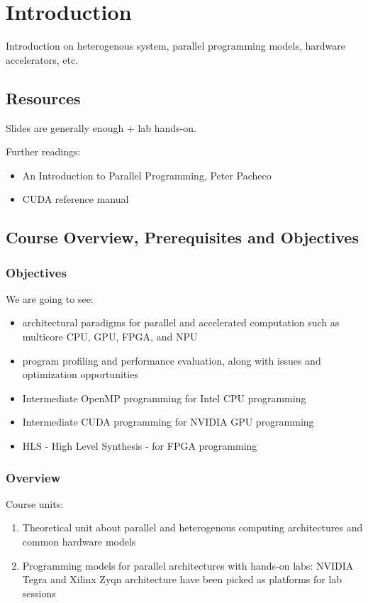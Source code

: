 \chapter{Introduction}

Introduction on heterogenous system, parallel programming models, hardware accelerators, etc.

\section{Resources}
Slides are generally enough + lab hands-on.

Further readings:
\begin{itemize}
  \item An Introduction to Parallel Programming, Peter Pacheco
  \item CUDA reference manual
\end{itemize}

\section{Course Overview, Prerequisites and Objectives}
\subsection{Objectives}
We are going to see:
\begin{itemize}
  \item architectural paradigms for parallel and accelerated computation such as multicore CPU, GPU, FPGA, and NPU
  \item program profiling and performance evaluation, along with issues and optimization opportunities
  \item Intermediate OpenMP programming for Intel CPU programming
  \item Intermediate CUDA programming for NVIDIA GPU programming
  \item HLS - High Level Synthesis - for FPGA programming
\end{itemize}

\subsection{Overview}
Course units:
\begin{enumerate}
  \item Theoretical unit about parallel and heterogenous computing architectures and common hardware models
  \item Programming models for parallel architectures with hands-on labs: NVIDIA Tegra and Xilinx Zyqn architecture have been picked as platforms for lab sessions
\end{enumerate}

